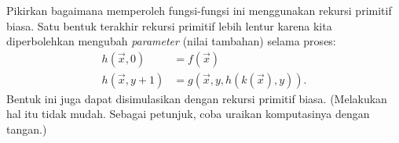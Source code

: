 \documentclass[../../../include/open-logic-section]{subfiles}
\begin{document}
Pikirkan bagaimana memperoleh fungsi-fungsi ini menggunakan rekursi primitif
biasa. Satu bentuk terakhir rekursi primitif lebih lentur karena kita
diperbolehkan mengubah \emph{parameter} (nilai tambahan) selama proses:
\begin{align*}
h(\vec x, 0) & = f(\vec x) \\
h(\vec x, y+1) & = g(\vec x, y, h(k(\vec x), y)).
\end{align*}
Bentuk ini juga dapat disimulasikan dengan rekursi primitif biasa. (Melakukan
hal itu tidak mudah. Sebagai petunjuk, coba uraikan komputasinya dengan tangan.)
\end{document}
